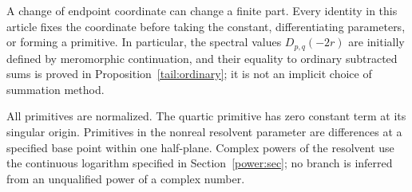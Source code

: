A change of endpoint coordinate can change a finite part. Every
identity in this article fixes the coordinate before taking the
constant, differentiating parameters, or forming a primitive.
In particular, the spectral values $D_{p,q}(-2r)$ are initially
defined by meromorphic continuation, and their equality to
ordinary subtracted sums is proved in
Proposition~\ref{tail:ordinary}; it is not an implicit choice
of summation method.

All primitives are normalized. The quartic primitive has zero
constant term at its singular origin. Primitives in the nonreal
resolvent parameter are differences at a specified base point
within one half-plane. Complex powers of the resolvent use the
continuous logarithm specified in
Section~\ref{power:sec}; no branch is inferred from an
unqualified power of a complex number.

